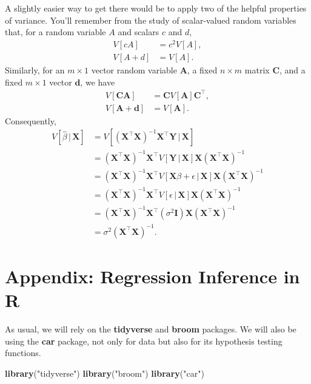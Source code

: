 \documentclass[12pt,oneside,openany]{book}
\newenvironment{Shaded}{\begin{snugshade}}{\end{snugshade}}
\newcommand{\KeywordTok}[1]{\textcolor[rgb]{0.13,0.29,0.53}{\textbf{#1}}}
\newcommand{\StringTok}[1]{\textcolor[rgb]{0.31,0.60,0.02}{#1}}
\newcommand{\NormalTok}[1]{#1}
\begin{document}
A slightly easier way to get there would be to apply two of the helpful
properties of variance. You'll remember from the study of scalar-valued
random variables that, for a random variable \(A\) and scalars \(c\) and
\(d\), \[
\begin{aligned}
  V[c A] &= c^2 V[A], \\
  V[A + d] &= V[A].
\end{aligned}
\] Similarly, for an \(m \times 1\) vector random variable
\(\mathbf{A}\), a fixed \(n \times m\) matrix \(\mathbf{C}\), and a
fixed \(m \times 1\) vector \(\mathbf{d}\), we have \[
\begin{aligned}
  V[\mathbf{C} \mathbf{A}] &= \mathbf{C} V[\mathbf{A}] \mathbf{C}^\top, \\
  V[\mathbf{A} + \mathbf{d}] &= V[\mathbf{A}].
\end{aligned}
\] Consequently, \[
\begin{aligned}
  V \left[ \hat{\beta} \,|\, \mathbf{X} \right]
  &= V[ (\mathbf{X}^\top \mathbf{X})^{-1} \mathbf{X}^\top \mathbf{Y} \,|\, \mathbf{X} ] \\
  &= (\mathbf{X}^\top \mathbf{X})^{-1} \mathbf{X}^\top V [\mathbf{Y} \,|\, \mathbf{X}] \mathbf{X} (\mathbf{X}^\top \mathbf{X})^{-1} \\
  &= (\mathbf{X}^\top \mathbf{X})^{-1} \mathbf{X}^\top V [\mathbf{X} \beta + \epsilon \,|\, \mathbf{X}] \mathbf{X} (\mathbf{X}^\top \mathbf{X})^{-1} \\
  &= (\mathbf{X}^\top \mathbf{X})^{-1} \mathbf{X}^\top V [\epsilon \,|\, \mathbf{X}] \mathbf{X} (\mathbf{X}^\top \mathbf{X})^{-1} \\
  &= (\mathbf{X}^\top \mathbf{X})^{-1} \mathbf{X}^\top (\sigma^2 \mathbf{I}) \mathbf{X} (\mathbf{X}^\top \mathbf{X})^{-1} \\
  &= \sigma^2 (\mathbf{X}^\top \mathbf{X})^{-1}.
\end{aligned}
\]

\section{Appendix: Regression Inference in
R}\label{appendix-regression-inference-in-r}

As usual, we will rely on the \textbf{tidyverse} and \textbf{broom}
packages. We will also be using the \textbf{car} package, not only for
data but also for its hypothesis testing functions.

\begin{Shaded}
\begin{Highlighting}[]
\KeywordTok{library}\NormalTok{(}\StringTok{"tidyverse"}\NormalTok{)}
\KeywordTok{library}\NormalTok{(}\StringTok{"broom"}\NormalTok{)}
\KeywordTok{library}\NormalTok{(}\StringTok{"car"}\NormalTok{)}
\end{Highlighting}
\end{Shaded}
\end{document}
